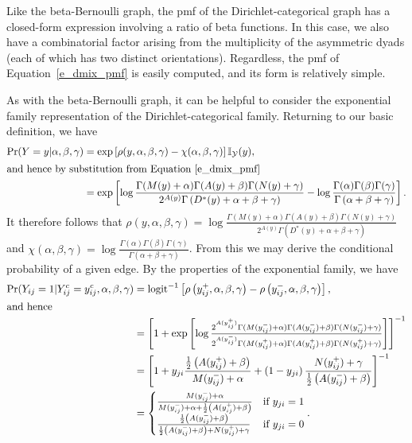 \documentclass[11pt]{article}
\newcommand{\ilogit}{\ensuremath{\mathrm{logit}^{-1}}\xspace}
\begin{document}
Like the beta-Bernoulli graph, the pmf of the Dirichlet-categorical graph has a closed-form expression involving a ratio of beta functions.  In this case, we also have a combinatorial factor arising from the multiplicity of the asymmetric dyads (each of which has two distinct orientations).  Regardless, the pmf of Equation~\ref{e_dmix_pmf} is easily computed, and its form is relatively simple.

As with the beta-Bernoulli graph, it can be helpful to consider the exponential family representation of the Dirichlet-categorical family.  Returning to our basic definition, we have
\begin{align*}
\Pr(Y=y|\alpha,\beta,\gamma) &= \exp\left[ \rho(y,\alpha,\beta,\gamma) - \chi(\alpha,\beta,\gamma) \right] \mathbb{I}_\mathcal{Y}(y), \\
\intertext{and hence by substitution from Equation~\ref{e_dmix_pmf}}
&= \exp\left[\log \frac{\Gamma(M(y)+\alpha)\Gamma(A(y)+\beta)\Gamma(N(y)+\gamma)}{2^{A(y)}\Gamma\left(D^*(y)+\alpha+\beta+\gamma\right)} - \log \frac{\Gamma(\alpha)\Gamma(\beta)\Gamma(\gamma)}{\Gamma\left(\alpha+\beta+\gamma\right)} \right].
\end{align*}
It therefore follows that $\rho(y,\alpha,\beta,\gamma)=\log\tfrac{\Gamma(M(y)+\alpha)\Gamma(A(y)+\beta)\Gamma(N(y)+\gamma)}{2^{A(y)}\Gamma\left(D^*(y)+\alpha+\beta+\gamma\right)}$ and $\chi(\alpha,\beta,\gamma)=\log \tfrac{\Gamma(\alpha)\Gamma(\beta)\Gamma(\gamma)}{\Gamma\left(\alpha+\beta+\gamma\right)}$.  From this we may derive the conditional probability of a given edge.  By the properties of the exponential family, we have
\begin{align}
\Pr(Y_{ij}=1|Y^c_{ij}=y^c_{ij},\alpha,\beta,\gamma) &= \ilogit\left[\rho\left(y^+_{ij},\alpha,\beta,\gamma\right)-\rho\left(y^-_{ij},\alpha,\beta,\gamma\right)\right], \nonumber\\
\intertext{and hence}
&= \left[1 + \exp\left[ \log \tfrac{2^{A(y^+_{ij})}\Gamma(M(y^-_{ij})+\alpha)\Gamma(A(y^-_{ij})+\beta)\Gamma(N(y^-_{ij})+\gamma)}{2^{A(y^-_{ij})}\Gamma(M(y^+_{ij})+\alpha)\Gamma(A(y^+_{ij})+\beta)\Gamma(N(y^+_{ij})+\gamma)} \right]\right]^{-1} \nonumber\\
&=\left[1 + y_{ji} \frac{\frac{1}{2}\left(A(y^+_{ij})+\beta\right)}{M(y^-_{ij})+\alpha} + \left(1-y_{ji}\right) \frac{N(y^+_{ij})+\gamma}{\frac{1}{2}\left(A(y^-_{ij})+\beta\right)}\right]^{-1} \nonumber\\
&=\begin{cases} \frac{M(y^-_{ij})+\alpha}{M(y^-_{ij})+\alpha+\frac{1}{2}\left(A(y^+_{ij})+\beta\right)} & \text{if } y_{ji}=1\\ \frac{\frac{1}{2}\left(A(y^-_{ij})+\beta\right)}{\frac{1}{2}\left(A(y^-_{ij})+\beta\right)+N(y^+_{ij})+\gamma} & \text{if } y_{ji}=0 \end{cases}. \label{e_dmix_condprob}
\end{align}
\end{document}
